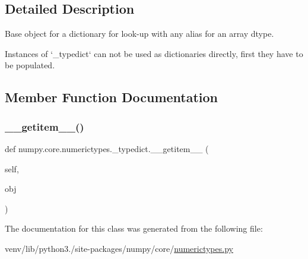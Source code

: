 \subsection{Detailed Description}
\begin{DoxyVerb}Base object for a dictionary for look-up with any alias for an array dtype.

Instances of `_typedict` can not be used as dictionaries directly,
first they have to be populated.\end{DoxyVerb}
 

\subsection{Member Function Documentation}
\mbox{\label{classnumpy_1_1core_1_1numerictypes_1_1__typedict_adfd8d12b1f7b5d765e10ba860d248905}} 
\subsubsection{\texorpdfstring{\+\_\+\+\_\+getitem\+\_\+\+\_\+()}{\_\_getitem\_\_()}}
{\footnotesize\ttfamily def numpy.\+core.\+numerictypes.\+\_\+typedict.\+\_\+\+\_\+getitem\+\_\+\+\_\+ (\begin{DoxyParamCaption}\item[{}]{self,  }\item[{}]{obj }\end{DoxyParamCaption})}



The documentation for this class was generated from the following file\+:\begin{DoxyCompactItemize}
\item 
venv/lib/python3./site-\/packages/numpy/core/\hyperlink{core_2numerictypes_8py}{numerictypes.\+py}\end{DoxyCompactItemize}
